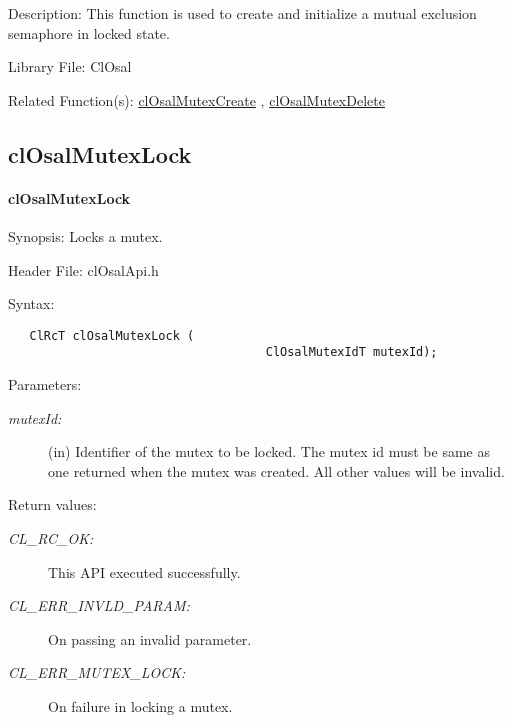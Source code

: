 \begin{Desc}
\item[Description:]This function is used to create and initialize a mutual exclusion semaphore in locked state.\end{Desc}
\begin{Desc}
\item[Library File:]Cl\-Osal\end{Desc}
\begin{Desc}
\item[Related Function(s):]\hyperlink{pageosal111}{cl\-Osal\-Mutex\-Create} , \hyperlink{pageosal115}{cl\-Osal\-Mutex\-Delete} \end{Desc}


\newpage


\subsection{clOsalMutexLock}
\hypertarget{pageosal100}{}\paragraph{cl\-Osal\-Mutex\-Lock}\label{pageosal100}
\begin{Desc}
\item[Synopsis:]Locks a mutex.\end{Desc}
\begin{Desc}
\item[Header File:]clOsalApi.h\end{Desc}
\begin{Desc}
\item[Syntax:]

\footnotesize\begin{verbatim}   ClRcT clOsalMutexLock (
 		                            ClOsalMutexIdT mutexId);

\end{verbatim}
\normalsize
\end{Desc}
\begin{Desc}
\item[Parameters:]
\begin{description}
\item[{\em mutex\-Id:}](in) Identifier of the mutex to be locked. The mutex id
 must be same as one returned when the mutex was
 created. All other values will be invalid.\end{description}
\end{Desc}
\begin{Desc}
\item[Return values:]
\begin{description}
\item[{\em CL\_\-RC\_\-OK:}]This API executed successfully. 
\item[{\em CL\_\-ERR\_\-INVLD\_\-PARAM:}]On passing an invalid parameter. 
\item[{\em CL\_\-ERR\_\-MUTEX\_\-LOCK:}]On failure in locking a mutex.\end{description}
\end{Desc}
